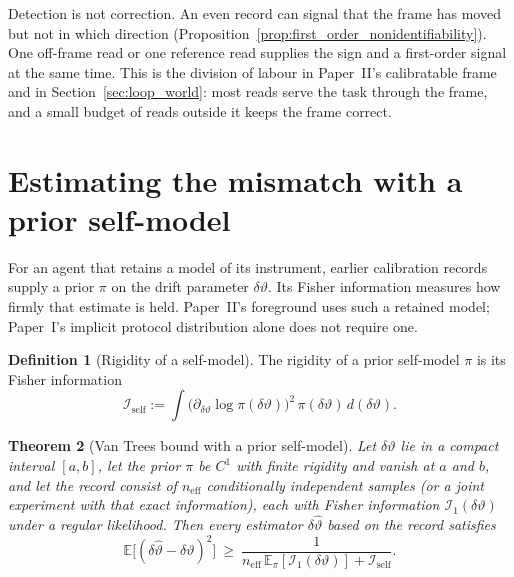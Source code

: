 \documentclass[12pt]{article}
\newtheorem{theorem}{Theorem}
\theoremstyle{definition}
\newtheorem{definition}[theorem]{Definition}
\newcommand{\E}{\mathbb E}
\begin{document}
Detection is not correction. An even record can signal that the frame has moved but not in which direction (Proposition~\ref{prop:first_order_nonidentifiability}). One off-frame read or one reference read supplies the sign and a first-order signal at the same time. This is the division of labour in Paper~II's calibratable frame and in Section~\ref{sec:loop_world}: most reads serve the task through the frame, and a small budget of reads outside it keeps the frame correct.

\section{Estimating the mismatch with a prior self-model}
\label{sec:SRCR}

For an agent that retains a model of its instrument, earlier calibration records supply a prior $\pi$ on the drift parameter $\delta\vartheta$. Its Fisher information measures how firmly that estimate is held. Paper~II's foreground uses such a retained model; Paper~I's implicit protocol distribution alone does not require one.

\begin{definition}[Rigidity of a self-model]
\label{def:ego_rigidity}
The rigidity of a prior self-model $\pi$ is its Fisher information
\begin{equation}
\label{eq:ego_rigidity}
\mathcal I_{\mathrm{self}}:=\int\bigl(\partial_{\delta\vartheta}\log\pi(\delta\vartheta)\bigr)^2\,\pi(\delta\vartheta)\,d(\delta\vartheta).
\end{equation}
\end{definition}

\begin{theorem}[Van Trees bound with a prior self-model]
\label{thm:SRCR}
Let $\delta\vartheta$ lie in a compact interval $[a,b]$, let the prior $\pi$ be $C^1$ with finite rigidity and vanish at $a$ and $b$, and let the record consist of $n_{\mathrm{eff}}$ conditionally independent samples (or a joint experiment with that exact information), each with Fisher information $\mathcal I_1(\delta\vartheta)$ under a regular likelihood. Then every estimator $\delta\hat\vartheta$ based on the record satisfies
\begin{equation}
\label{eq:SRCR}
\E\bigl[(\delta\hat\vartheta-\delta\vartheta)^2\bigr]\ \ge\ \frac1{n_{\mathrm{eff}}\,\E_\pi[\mathcal I_1(\delta\vartheta)]+\mathcal I_{\mathrm{self}}}.
\end{equation}
\end{theorem}
\end{document}

